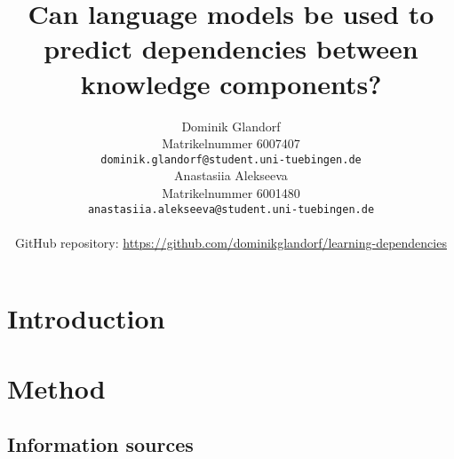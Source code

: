 \documentclass{article}
\title{Can language models be used to predict dependencies between knowledge components?}
\author{%
  Dominik Glandorf\\
  Matrikelnummer 6007407\\
  \texttt{dominik.glandorf@student.uni-tuebingen.de} \\
  \And
  Anastasiia Alekseeva\\
  Matrikelnummer 6001480\\
  \texttt{anastasiia.alekseeva@student.uni-tuebingen.de} \\
  \\
  GitHub repository: \url{https://github.com/dominikglandorf/learning-dependencies}
}
\begin{document}
\vspace*{-5mm}
\maketitle
\vspace*{-5mm}

\begin{abstract}





\end{abstract}

\section{Introduction}




\section{Method}

\subsection{Information sources}
\end{document}
